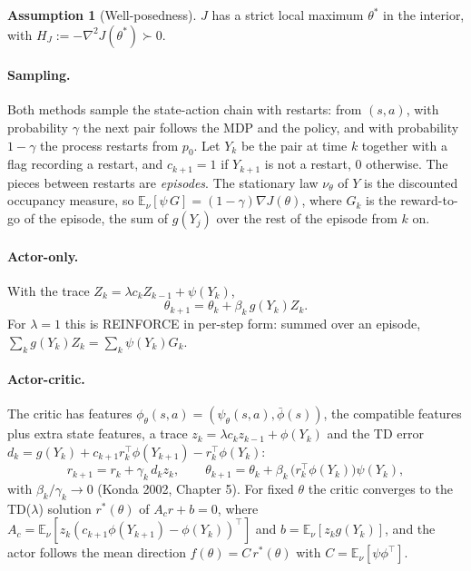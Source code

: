 \documentclass[11pt]{article}
\theoremstyle{definition}
\newtheorem{assumption}[theorem]{Assumption}
\theoremstyle{remark}
\newcommand{\E}{\mathbb{E}}
\begin{document}
\begin{assumption}[Well-posedness]\label{ass:wp}
$J$ has a strict local maximum $\theta^*$ in the interior, with
$H_J := -\nabla^2J(\theta^*) \succ 0$.
\end{assumption}

\paragraph{Sampling.} Both methods sample the state-action chain with restarts: from $(s,a)$,
with probability $\gamma$ the next pair follows the MDP and the policy, and with probability
$1 - \gamma$ the process restarts from $p_0$. Let $Y_k$ be the pair at time $k$ together with a flag
recording a restart, and $c_{k+1} = 1$ if $Y_{k+1}$ is not a restart, $0$ otherwise. The pieces
between restarts are \emph{episodes}. The stationary law $\nu_\theta$ of $Y$ is the discounted
occupancy measure, so $\E_\nu[\psi\,G] = (1-\gamma)\nabla J(\theta)$, where $G_k$ is the
reward-to-go of the episode, the sum of $g(Y_j)$ over the rest of the episode from $k$ on.

\paragraph{Actor-only.} With the trace $Z_k = \lambda c_kZ_{k-1} + \psi(Y_k)$,
\[
  \theta_{k+1} = \theta_k + \beta_k\,g(Y_k)Z_k .
\]
For $\lambda = 1$ this is REINFORCE in per-step form: summed over an episode, $\sum_kg(Y_k)Z_k
= \sum_k\psi(Y_k)G_k$.

\paragraph{Actor-critic.} The critic has features $\phi_\theta(s,a) = (\psi_\theta(s,a), \bar\phi(s))$,
the compatible features plus extra state features, a trace $z_k = \lambda c_kz_{k-1} + \phi(Y_k)$
and the TD error $d_k = g(Y_k) + c_{k+1}r_k^\top\phi(Y_{k+1}) - r_k^\top\phi(Y_k)$:
\[
  r_{k+1} = r_k + \gamma_k\,d_kz_k,\qquad \theta_{k+1} = \theta_k + \beta_k\,\big(r_k^\top\phi(Y_k)\big)\psi(Y_k),
\]
with $\beta_k/\gamma_k \to 0$ (Konda 2002, Chapter 5). For fixed $\theta$ the critic converges to the
TD($\lambda$) solution $r^*(\theta)$ of $A_c r + b = 0$, where
$A_c = \E_\nu[z_k(c_{k+1}\phi(Y_{k+1}) - \phi(Y_k))^\top]$ and $b = \E_\nu[z_kg(Y_k)]$, and the actor
follows the mean direction $f(\theta) = C\,r^*(\theta)$ with $C = \E_\nu[\psi\phi^\top]$.

\end{document}
